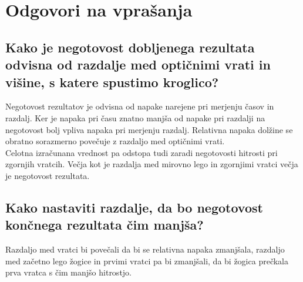 \documentclass[a4paper]{report}
\begin{document}
\chapter*{Odgovori na vprašanja}
 \section*{Kako je negotovost dobljenega rezultata odvisna od razdalje med optičnimi vrati in višine, s katere spustimo kroglico?}

Negotovost rezultatov je odvisna od napake narejene pri merjenju časov in razdalj. Ker je napaka pri času znatno manjša od napake pri razdalji na negotovost bolj vpliva napaka pri merjenju razdalj. Relativna napaka dolžine se obratno sorazmerno povečuje z razdaljo med optičnimi vrati.
\\

Celotna izračunana vrednost pa odstopa tudi zaradi negotovosti hitrosti pri zgornjih vratcih. Večja kot je razdalja med mirovno lego in zgornjimi vratci večja je negotovost rezultata.
\\
\section*{Kako nastaviti razdalje, da bo negotovost končnega rezultata čim manjša?}

Razdaljo med vratci bi povečali da bi se relativna napaka zmanjšala, razdaljo med začetno lego žogice in prvimi vratci pa bi zmanjšali, da bi žogica prečkala prva vratca s čim manjšo hitrostjo.
\end{document}
